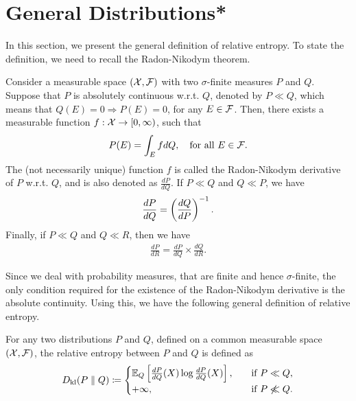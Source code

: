     \section{General Distributions*}
        In this section, we present the general definition of relative entropy. To state the definition, we need to recall the Radon-Nikodym theorem. 
        \begin{fact}
            \label{fact:radon-nikodym}
            Consider a measurable space $(\mathcal{X}, \mathcal{F})$ with two $\sigma$-finite  measures $P$ and $Q$. Suppose that $P$ is absolutely continuous w.r.t. $Q$, denoted by $P \ll Q$, which means that $Q(E)=0 \Rightarrow P(E)=0$, for any $E \in \mathcal{F}$. Then, there exists a measurable function $f: \mathcal{X} \to [0, \infty)$, such that 
            \begin{align}
                P(E) = \int_{E} f dQ, \quad \text{for all } E \in \mathcal{F}. 
            \end{align}
            The (not necessarily unique) function $f$ is called the Radon-Nikodym derivative of $P$ w.r.t. $Q$, and is also denoted as $\frac{dP}{dQ}$.  
            If $P \ll Q$ and $Q \ll P$, we have 
            \begin{align}
                \frac{dP}{dQ} = \left( \frac{dQ}{dP} \right)^{-1}. 
            \end{align}
            Finally, if $P \ll Q$ and $Q \ll R$, then we have 
            \begin{align}
                \frac{dP}{dR} = \frac{dP}{dQ} \times \frac{dQ}{dR}. 
            \end{align}
        \end{fact}

        Since we deal with probability measures, that are finite and hence $\sigma$-finite, the only condition required for the existence of the Radon-Nikodym derivative is the absolute continuity. Using this, we have the following general definition of relative entropy. 
        \begin{definition}
            \label{def:rel-ent-general} 
            For any two distributions $P$ and $Q$, defined on a common measurable space $(\mathcal{X}, \mathcal{F})$, the relative entropy between $P$ and $Q$ is defined as 
            \begin{align}
                D_{\text{kl}}(P \parallel Q) \coloneqq 
                \begin{cases}
                 \mathbb{E}_Q \left[ \frac{dP}{dQ}(X) \log \frac{dP}{dQ}(X) \right], & \quad \text{if } P\ll Q, \\
                 + \infty, & \quad \text{if } P \not \ll Q.  
                \end{cases}
            \end{align}
        \end{definition}

